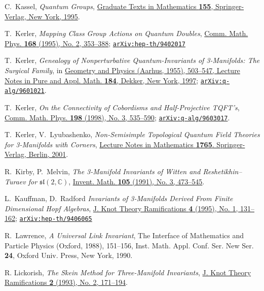 \documentclass[a4paper,reqno]{amsart}
\theoremstyle{definition}
\theoremstyle{remark}
\newcommand{\C}{\mathbb{C}}
\newcommand{\fsl}{\mathfrak{sl}}
\newcommand\doi[2]{\href{https://doi.org/#1}{#2}}
\begin{document}
\begin{thebibliography}{99}
 C.~Kassel,
 \textit{Quantum Groups},
 \doi{10.1007/978-1-4612-0783-2}{Graduate Texts in Mathematics \textbf{155}, Springer-Verlag, New York, 1995}.
 
 T.~Kerler,
 \textit{Mapping Class Group Actions on Quantum Doubles},
 \doi{10.1007/BF02101554}{Comm. Math. Phys. \textbf{168} (1995), No. 2, 353--388};
 \href{http://arXiv.org/abs/hep-th/9402017}{\texttt{arXiv:hep-th/9402017}}
 
 T.~Kerler,
 \textit{Genealogy of Nonperturbative Quantum-Invariants of 3-Manifolds: The Surgical Family}, in 
 \href{https://www.crcpress.com/Geometry-and-Physics/Pedersen-Andersen-Dupont-Swann/p/book/9780824797911}{Geometry and Physics (Aarhus, 1955), 503--547, Lecture Notes in Pure and Appl. Math. \textbf{184}, Dekker, New York, 1997};
 \href{http://arXiv.org/abs/q-alg/9601021}{\texttt{arXiv:q-alg/9601021}}.
 
 T.~Kerler,
 \textit{On the Connectivity of Cobordisms and Half-Projective TQFT's},
 \doi{10.1007/s002200050487}{Comm. Math. Phys. \textbf{198} (1998), No. 3, 535--590};
 \href{http://arXiv.org/abs/q-alg/9603017}{\texttt{arXiv:q-alg/9603017}}.
 
 T.~Kerler, V.~Lyubashenko,
 \textit{Non-Semisimple Topological Quantum Field Theories for 3-Manifolds with Corners},
 \doi{10.1007/b82618}{Lecture Notes in Mathematics \textbf{1765}. Springer-Verlag, Berlin, 2001}.
 
 R.~Kirby, P.~Melvin,
 \textit{The 3-Manifold Invariants of Witten and Reshetikhin--Turaev for $\fsl(2,\C)$},
 \doi{10.1007/BF01232277}{Invent. Math. \textbf{105} (1991), No. 3, 473--545}.
 
 L.~Kauffman, D.~Radford
 \textit{Invariants of 3-Manifolds Derived From Finite Dimensional Hopf Algebras},
 \doi{10.1142/S0218216595000077}{J. Knot Theory Ramifications \textbf{4} (1995), No. 1, 131--162};
 \href{http://arXiv.org/abs/hep-th/9406065}{\texttt{arXiv:hep-th/9406065}}
 
 R.~Lawrence,
 \textit{A Universal Link Invariant},
 The Interface of Mathematics and Particle Physics (Oxford, 1988), 151--156, Inst. Math. Appl. Conf. Ser. New Ser. \textbf{24}, Oxford Univ. Press, New York, 1990.
 
 R. Lickorish,
 \textit{The Skein Method for Three-Manifold Invariants},
 \doi{10.1142/S0218216593000118}{J. Knot Theory Ramifications \textbf{2} (1993), No. 2, 171--194}.
 

\end{thebibliography}
\end{document}

